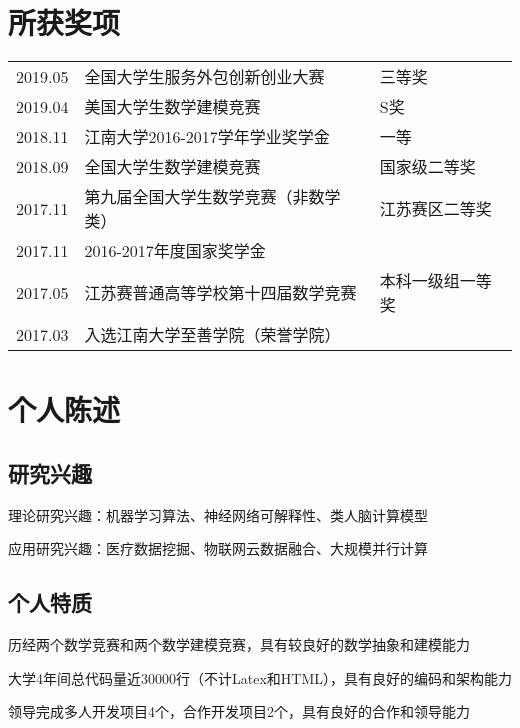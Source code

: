 \documentclass[]{deedy-resume-openfont}
\begin{document}
\begin{minipage}[t]{0.73\textwidth}
	\section{所获奖项}
    \begin{tabular}{lll}
        2019.05 & 全国大学生服务外包创新创业大赛 & 三等奖 \\
        2019.04 & 美国大学生数学建模竞赛 & S奖 \\
        2018.11 & 江南大学2016-2017学年学业奖学金 & 一等 \\
        2018.09 & 全国大学生数学建模竞赛 & 国家级二等奖 \\
        2017.11 & 第九届全国大学生数学竞赛（非数学类） & 江苏赛区二等奖 \\
        2017.11 & 2016-2017年度国家奖学金 & \\
        2017.05 & 江苏赛普通高等学校第十四届数学竞赛 & 本科一级组一等奖\\
        2017.03 & 入选江南大学至善学院（荣誉学院）& \\
	\end{tabular}
    \sectionsep
    
    \section{个人陈述}
    \subsection{研究兴趣}
    \vspace{\topsep}
	\begin{tightemize}
		\item 理论研究兴趣：机器学习算法、神经网络可解释性、类人脑计算模型
		\item 应用研究兴趣：医疗数据挖掘、物联网云数据融合、大规模并行计算
	\end{tightemize}
    \subsection{个人特质}
    \vspace{\topsep}
    \begin{tightemize}
        \item 历经两个数学竞赛和两个数学建模竞赛，具有较良好的数学抽象和建模能力
		\item 大学4年间总代码量近30000行（不计Latex和HTML），具有良好的编码和架构能力
		\item 领导完成多人开发项目4个，合作开发项目2个，具有良好的合作和领导能力
	\end{tightemize}
\end{minipage}
\end{document}
